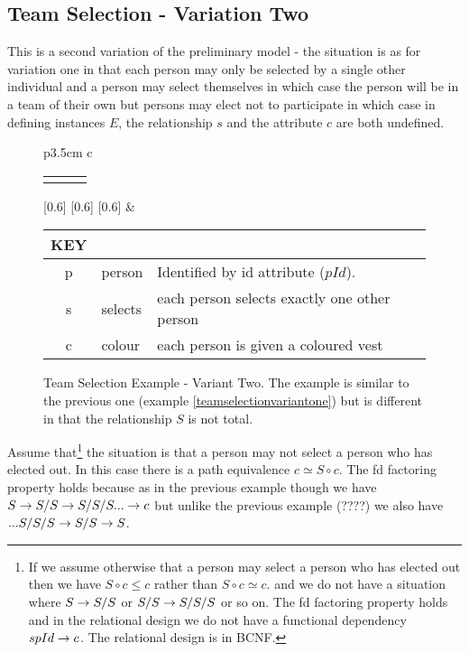 \subsection{Team Selection - Variation Two}
This is a second variation of the preliminary model - the situation is as for variation one in that  each person may only be selected by a single other individual and a person may select themselves in which case the person will be in a team of their own but persons may elect not to participate in which case
in defining instances $E$, the relationship $s$ and the attribute $c$ are both undefined.

\begin{figure} [h]
\begin{center}
\begin{tabular}{p{3.5cm} c}
\begin{tabular}{c p{1.5cm} c}
   \Rnode{p}{p} & & \Rnode{v}{v}
\end{tabular}
[0.6]
[0.6]
[0.6]
\idcomp
& \footnotesize
\begin{tabular}{c p{1.5cm} p{4cm}}
KEY && \\
\hline
p & person & Identified by id attribute ($pId$). \\
s & selects & each person selects exactly one other person \\
c & colour & each person is given a coloured vest 
\end{tabular} 
\end{tabular}
\end{center}
\caption{Team Selection Example  - Variant Two. The example is similar to the previous one (example \ref{teamselectionvariantone})
but is different in that the relationship $S$ is not total.
}
\label{teamselectionvarianttwoERschema}
\end{figure}

Assume that\footnote{If we assume otherwise that a person may select a person who has elected out then we have $S \circ c \leq c$ rather than $S \circ c \simeq c$.
and we do not have a situation where $S \rightarrow S/S$ or $S/S \rightarrow S/S/S$ or so on.  The fd factoring property holds and in the relational design we do not
have a functional dependency $spId \rightarrow c$. The relational design is in BCNF.}
the situation is that a person may not select a person who has elected out. In this case there is a  path equivalence $c \simeq S \circ c$.
The fd factoring property holds because as in the previous example though we have $S \rightarrow S/S \rightarrow S/S/S ... \rightarrow c$ 
but unlike the previous example (????) we also have $... S/S/S \rightarrow S/S \rightarrow S$. 

